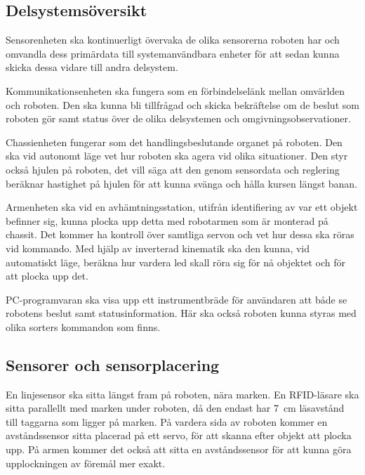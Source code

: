 \documentclass[a4paper,12pt]{article}
\begin{document}
\subsection{Delsystemsöversikt}
Sensorenheten ska kontinuerligt övervaka de olika sensorerna roboten har och omvandla dess primärdata till systemanvändbara enheter för att sedan kunna skicka dessa vidare till andra delsystem.

Kommunikationsenheten ska fungera som en förbindelselänk mellan omvärlden och roboten. Den ska kunna bli tillfrågad och skicka bekräftelse om de beslut som roboten gör samt status över de olika delsystemen och omgivningsobservationer.

Chassienheten fungerar som det handlingsbeslutande organet på roboten. Den ska vid autonomt läge vet hur roboten ska agera vid olika situationer. Den styr också hjulen på roboten, det vill säga att den genom sensordata och reglering beräknar hastighet på hjulen för att kunna svänga och hålla kursen längst banan.

Armenheten ska vid en avhämtningsstation, utifrån identifiering av var ett objekt befinner sig, kunna plocka upp detta med robotarmen som är monterad på chassit. Det kommer ha kontroll över samtliga servon och vet hur dessa ska röras vid kommando. Med hjälp av inverterad kinematik ska den kunna, vid automatiskt läge, beräkna hur vardera led skall röra sig för nå objektet och för att plocka upp det.

PC-programvaran ska visa upp ett instrumentbräde för användaren att både se robotens beslut samt statusinformation. Här ska också roboten kunna styras med olika sorters kommandon som finns.

\subsection{Sensorer och sensorplacering}

En linjesensor ska sitta längst fram på roboten, nära marken. En RFID-läsare ska sitta parallellt med marken under roboten, då den endast har 7~cm läsavstånd till taggarna som ligger på marken. På vardera sida av roboten kommer en avståndssensor sitta placerad på ett servo, för att skanna efter objekt att plocka upp. På armen kommer det också att sitta en avståndssensor för att kunna göra upplockningen av föremål mer exakt.








\newpage
\appendix


\end{document}
